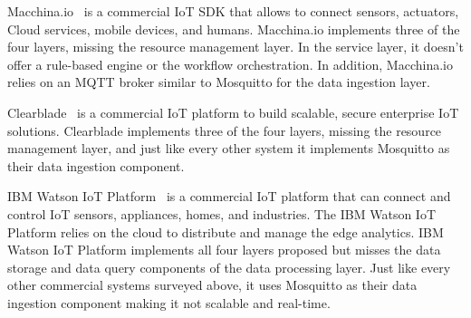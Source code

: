 Macchina.io~\cite{Macchina.io} is a commercial IoT SDK that allows to connect sensors, actuators, Cloud services, mobile devices, and humans. Macchina.io implements three of the four layers, missing the resource management layer. In the service layer, it doesn't offer a rule-based engine or the workflow orchestration. In addition, Macchina.io relies on an MQTT broker similar to Mosquitto for the data ingestion layer.

Clearblade~\cite{Clearblade} is a commercial IoT platform to build scalable, secure enterprise IoT solutions. Clearblade implements three of the four layers, missing the resource management layer, and just like every other system it implements Mosquitto as their data ingestion component.

IBM Watson IoT Platform~\cite{IBM} is a commercial IoT platform that can connect and control IoT sensors, appliances, homes, and industries. The IBM Watson IoT Platform relies on the cloud to distribute and manage the edge analytics. IBM Watson IoT Platform implements all four layers proposed but misses the data storage and data query components of the data processing layer. Just like every other commercial systems surveyed above, it uses Mosquitto as their data ingestion component making it not scalable and real-time.

